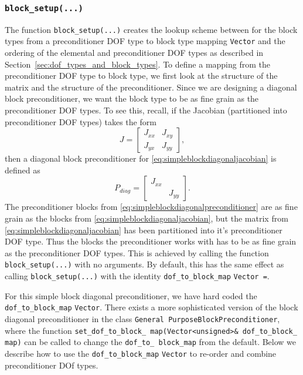 \subsubsection{\texttt{block\_setup(...)}\label{sec:block_setup}}
The function \texttt{block\_\allowbreak setup(...)} creates the lookup scheme
between for the block types from a preconditioner DOF type to block type
mapping \texttt{Vector} and the ordering of the elemental and preconditioner
DOF types as described in Section~\ref{sec:dof_types_and_block_types}. To
define a mapping from the preconditioner DOF type to block type, we first look
at the structure of the matrix and the structure of the preconditioner. Since
we are designing a diagonal block preconditioner, we want the block type to be
as fine grain as the preconditioner DOF types. To see this, recall, if the
Jacobian (partitioned into preconditioner DOF types) takes the form 
\begin{equation}
J =
\begin{bmatrix}
J_{xx}&J_{xy} \\
J_{yx}&J_{yy}
\end{bmatrix},
\label{eq:simpleblockdiagonaljacobian}
\end{equation}
then a diagonal block preconditioner for \eqref{eq:simpleblockdiagonaljacobian}
is defined as
\begin{equation*}
P_{diag} =
\begin{bmatrix}
J_{xx}& \\
      &J_{yy}
\end{bmatrix}.
\label{eq:simpleblockdiagonalpreconditioner}
\end{equation*}
The preconditioner blocks from \eqref{eq:simpleblockdiagonalpreconditioner} are
as fine grain as the blocks from \eqref{eq:simpleblockdiagonaljacobian}, but
the matrix from \eqref{eq:simpleblockdiagonaljacobian} has been partitioned
into it's preconditioner DOF type. Thus the blocks the preconditioner works
with has to be as fine grain as the preconditioner DOF types. This is achieved
by calling the function \texttt{block\_\allowbreak setup(...)} with no
arguments. By default, this has the same effect as calling
\texttt{block\_\allowbreak setup(...)} with the identity
\texttt{dof\_\allowbreak to\_\allowbreak block\_\allowbreak map} \texttt{Vector
  \allowbreak =\allowbreak [0 1]}.


For this simple block diagonal preconditioner, we have hard coded the
\texttt{dof\_\allowbreak to\_\allowbreak block\_\allowbreak map}
\texttt{Vector}. There exists a more sophisticated version of the block
diagonal preconditioner in the class \texttt{General\allowbreak
  Purpose\allowbreak Block\allowbreak Preconditioner}, where the function
\texttt{set\_\allowbreak dof\_\allowbreak to\_\allowbreak block\_\allowbreak
  map(Vector<unsigned>\& dof\_\allowbreak to\_\allowbreak block\_\allowbreak
  map)} can be called to change the \texttt{dof\_\allowbreak to\_\allowbreak
  block\_\allowbreak map} from the default. Below we describe how to use the \texttt{dof\_\allowbreak to\_\allowbreak block\_\allowbreak map}
\texttt{Vector} to re-order and combine preconditioner DOf types.


